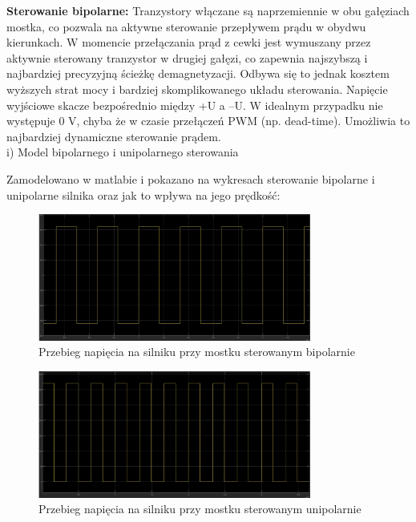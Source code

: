 \documentclass[11pt]{article}
\begin{document}
\textbf{Sterowanie bipolarne:}
Tranzystory włączane są naprzemiennie w obu gałęziach mostka, co pozwala na aktywne sterowanie przepływem prądu w obydwu kierunkach. W momencie przełączania prąd z cewki jest wymuszany przez aktywnie sterowany tranzystor w drugiej gałęzi, co zapewnia najszybszą i najbardziej precyzyjną ścieżkę demagnetyzacji. Odbywa się to jednak kosztem wyższych strat mocy i bardziej skomplikowanego układu sterowania.
Napięcie wyjściowe skacze bezpośrednio między +U a –U. W idealnym przypadku nie występuje 0 V, chyba że w czasie przełączeń PWM (np. dead-time). Umożliwia to najbardziej dynamiczne sterowanie prądem.\\

i) Model bipolarnego i unipolarnego sterowania

Zamodelowano w matlabie i pokazano na wykresach sterowanie bipolarne i unipolarne silnika oraz jak to wpływa na jego prędkość:\\

\begin{figure}[H]
\centering
\includegraphics[width=0.8\textwidth]{aun1_bipolar_bridge.png}
\caption{Przebieg napięcia na silniku przy mostku sterowanym bipolarnie}
\end{figure}

\begin{figure}[H]
\centering
\includegraphics[width=0.8\textwidth]{aun1_unipolar_bridge.png}
\caption{Przebieg napięcia na silniku przy mostku sterowanym unipolarnie}
\end{figure}
\end{document}
